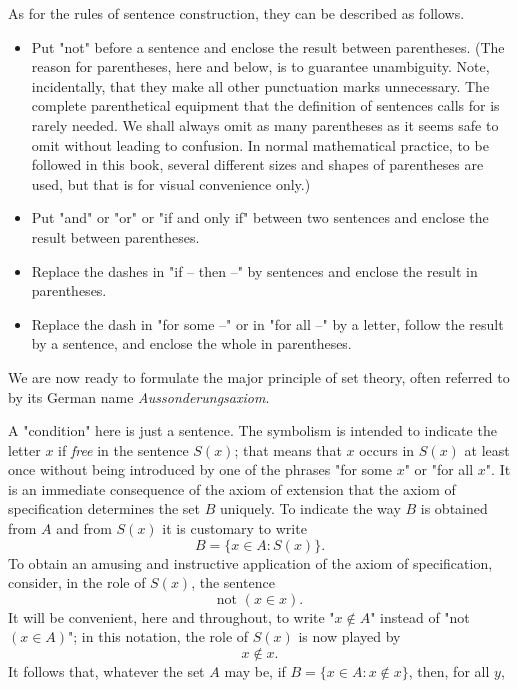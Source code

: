 As for the rules of sentence construction, they can be described as follows. 

\begin{itemize}
	\item Put "not" before a sentence and enclose the result between parentheses. (The reason for parentheses, here and below, is to guarantee unambiguity. Note, incidentally, that they make all other punctuation marks unnecessary. The complete parenthetical equipment that the definition of sentences calls for is rarely needed. We shall always omit as many parentheses as it seems safe to omit without leading to confusion. In normal mathematical practice, to be followed in this book, several different sizes and shapes of parentheses are used, but that is for visual convenience only.)
	\item Put "and" or "or" or "if and only if" between two sentences and enclose the result between parentheses.
	\item Replace the dashes in "if -- then --" by sentences and enclose the result in parentheses.
	\item Replace the dash in "for some --" or in "for all --" by a letter, follow the result by a sentence, and enclose the whole in parentheses.
\end{itemize}

We are now ready to formulate the major principle of set theory, often referred to by its German name \textit{Aussonderungsaxiom}.


A "condition" here is just a sentence. The symbolism is intended to indicate the letter $x$ if \textit{free} in the sentence $S(x)$; that means that $x$ occurs in $S(x)$ at least once without being introduced by one of the phrases "for some $x$" or "for all $x$". It is an immediate consequence of the axiom of extension that the axiom of specification determines the set $B$ uniquely. To indicate the way $B$ is obtained from $A$ and from $S(x)$ it is customary to write
\[
	B = \{ x \in A : S(x) \}.
\]
To obtain an amusing and instructive application of the axiom of specification, consider, in the role of $S(x)$, the sentence
\[
	\text{not } (x \in x).
\]
It will be convenient, here and throughout, to write "$x \not\in A$" instead of "not $(x \in A)$"; in this notation, the role of $S(x)$ is now played by
\[
	x \not\in x.
\]
It follows that, whatever the set $A$ may be, if $B = \{ x\in A : x \not \in x \}$, then, for all $y$,

